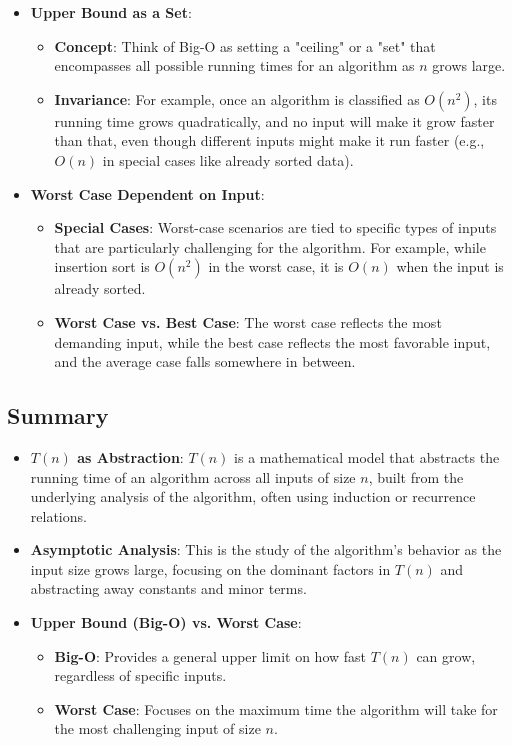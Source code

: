 \documentclass{article}
\begin{document}
\begin{itemize}
    \item \textbf{Upper Bound as a Set}:
    \begin{itemize}
        \item \textbf{Concept}: Think of Big-O as setting a "ceiling" or a "set" that encompasses all possible running times for an algorithm as \(n\) grows large.
        \item \textbf{Invariance}: For example, once an algorithm is classified as \(O(n^2)\), its running time grows quadratically, and no input will make it grow faster than that, even though different inputs might make it run faster (e.g., \(O(n)\) in special cases like already sorted data).
    \end{itemize}

    \item \textbf{Worst Case Dependent on Input}:
    \begin{itemize}
        \item \textbf{Special Cases}: Worst-case scenarios are tied to specific types of inputs that are particularly challenging for the algorithm. For example, while insertion sort is \(O(n^2)\) in the worst case, it is \(O(n)\) when the input is already sorted.
        \item \textbf{Worst Case vs. Best Case}: The worst case reflects the most demanding input, while the best case reflects the most favorable input, and the average case falls somewhere in between.
    \end{itemize}
\end{itemize}

\subsection*{Summary}

\begin{itemize}
    \item \textbf{\(T(n)\) as Abstraction}: \(T(n)\) is a mathematical model that abstracts the running time of an algorithm across all inputs of size \(n\), built from the underlying analysis of the algorithm, often using induction or recurrence relations.
    \item \textbf{Asymptotic Analysis}: This is the study of the algorithm's behavior as the input size grows large, focusing on the dominant factors in \(T(n)\) and abstracting away constants and minor terms.
    \item \textbf{Upper Bound (Big-O) vs. Worst Case}:
    \begin{itemize}
        \item \textbf{Big-O}: Provides a general upper limit on how fast \(T(n)\) can grow, regardless of specific inputs.
        \item \textbf{Worst Case}: Focuses on the maximum time the algorithm will take for the most challenging input of size \(n\).
    \end{itemize}
\end{itemize}
\end{document}
